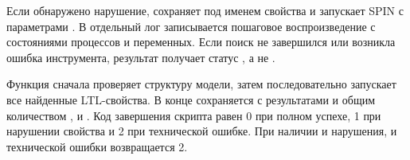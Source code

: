 Если обнаружено нарушение,  сохраняет
 под именем свойства и запускает SPIN
с параметрами . В отдельный лог записывается
пошаговое воспроизведение с состояниями процессов и переменных.
Если поиск не завершился или возникла ошибка инструмента,
результат получает статус , а не .

Функция  сначала проверяет структуру модели, затем
последовательно запускает все найденные LTL-свойства. В конце сохраняется
 с результатами и общим количеством ,
 и . Код завершения скрипта равен 0 при полном
успехе, 1 при нарушении свойства и 2 при технической ошибке. При наличии
и нарушения, и технической ошибки возвращается 2.
